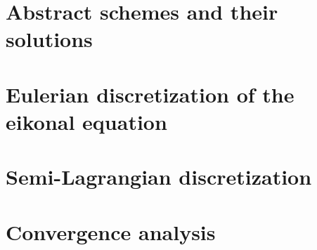 \documentclass[11pt]{article}
\begin{document}
\section{Abstract schemes and their solutions}
\label{sec:abstract}


\section{Eulerian discretization of the eikonal equation}
\label{sec:Eulerian}


\section{Semi-Lagrangian discretization}
\label{sec:SemiLagrangian}


\section{Convergence analysis}
\label{sec:convergence}





\end{document}
